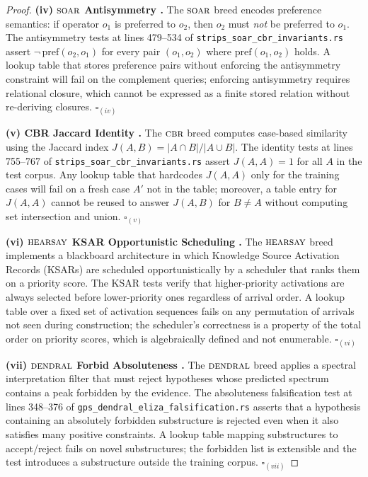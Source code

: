 \begin{proof}
\medskip\noindent
\textbf{(iv) $\textsc{soar}$ Antisymmetry \cite{laird1987soar}.}
The $\textsc{soar}$ breed encodes preference semantics: if operator $o_1$ is
preferred to $o_2$, then $o_2$ must \emph{not} be preferred to $o_1$.
The antisymmetry tests at lines 479--534 of
\texttt{strips\_soar\_cbr\_invariants.rs} assert $\neg\,\mathrm{pref}(o_2,
o_1)$ for every pair $(o_1, o_2)$ where $\mathrm{pref}(o_1, o_2)$ holds.
A lookup table that stores preference pairs without enforcing the
antisymmetry constraint will fail on the complement queries; enforcing
antisymmetry requires relational closure, which cannot be expressed as a
finite stored relation without re-deriving closures.  \qquad $\square_{(iv)}$

\medskip\noindent
\textbf{(v) CBR Jaccard Identity \cite{aamodt1994cbr}.}
The $\textsc{cbr}$ breed computes case-based similarity using the Jaccard index
$J(A,B) = |A \cap B| / |A \cup B|$.  The identity tests at lines 755--767
of \texttt{strips\_soar\_cbr\_invariants.rs} assert $J(A, A) = 1$ for
all $A$ in the test corpus.  Any lookup table that hardcodes $J(A, A)$
only for the training cases will fail on a fresh case $A'$ not in the
table; moreover, a table entry for $J(A, A)$ cannot be reused to answer
$J(A, B)$ for $B \neq A$ without computing set intersection and union.
\qquad $\square_{(v)}$

\medskip\noindent
\textbf{(vi) $\textsc{hearsay}$ KSAR Opportunistic Scheduling \cite{erman1980hearsay}.}
The $\textsc{hearsay}$ breed implements a blackboard architecture in which
Knowledge Source Activation Records (KSARs) are scheduled opportunistically
by a scheduler that ranks them on a priority score.  The KSAR tests verify
that higher-priority activations are always selected before lower-priority
ones regardless of arrival order.  A lookup table over a fixed set of
activation sequences fails on any permutation of arrivals not seen during
construction; the scheduler's correctness is a property of the total order
on priority scores, which is algebraically defined and not enumerable.
\qquad $\square_{(vi)}$

\medskip\noindent
\textbf{(vii) $\textsc{dendral}$ Forbid Absoluteness \cite{feigenbaum1971dendral}.}
The $\textsc{dendral}$ breed applies a spectral interpretation filter that must
reject hypotheses whose predicted spectrum contains a peak forbidden by
the evidence.  The absoluteness falsification test at lines 348--376 of
\texttt{gps\_dendral\_eliza\_falsification.rs} asserts that a hypothesis
containing an absolutely forbidden substructure is rejected even when it
also satisfies many positive constraints.  A lookup table mapping
substructures to accept/reject fails on novel substructures; the forbidden
list is extensible and the test introduces a substructure outside the
training corpus.  \qquad $\square_{(vii)}$


\end{proof}
